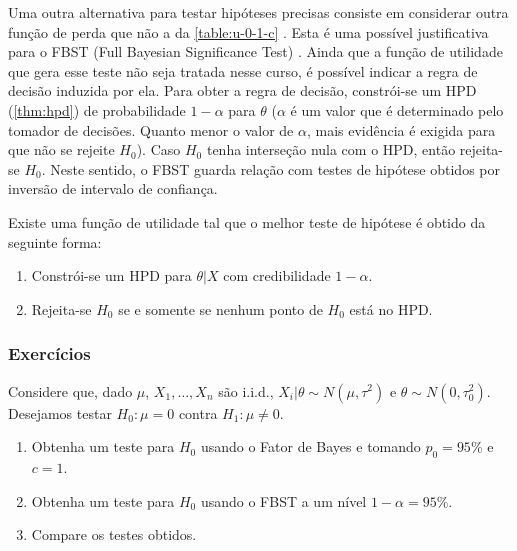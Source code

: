 Uma outra alternativa para testar 
hipóteses precisas consiste em 
considerar outra função de perda que não 
a da \cref{table:u-0-1-c} \citep{Madruga2001}.
Esta é uma possível justificativa para 
o FBST (Full Bayesian Significance Test) 
\citep{Pereira1999}.
Ainda que a função de utilidade que gera esse teste 
não seja tratada nesse curso,
é possível indicar a regra de decisão induzida por ela.
Para obter a regra de decisão, constrói-se 
um HPD (\cref{thm:hpd}) de probabilidade $1-\alpha$ 
para $\theta$ ($\alpha$ é um valor que 
é determinado pelo tomador de decisões. 
Quanto menor o valor de $\alpha$, 
mais evidência é exigida para que 
não se rejeite $H_{0}$).
Caso $H_{0}$ tenha interseção nula com o HPD, 
então rejeita-se $H_{0}$.
Neste sentido, o FBST guarda relação com 
testes de hipótese obtidos por inversão de 
intervalo de confiança.

\begin{theorem}[FBST]
 Existe uma função de utilidade \citep{Madruga2001}
 tal que o melhor teste de hipótese é 
 obtido da seguinte forma:
 \begin{enumerate}
  \item Constrói-se um HPD para $\theta|X$ com
  credibilidade $1-\alpha$.
  \item Rejeita-se $H_{0}$ se e somente se
  nenhum ponto de $H_{0}$ está no HPD.
 \end{enumerate}
\end{theorem}

\subsubsection*{Exercícios}

\begin{exercise}
 Considere que, dado $\mu$, 
 $X_{1},\ldots,X_{n}$ são i.i.d.,
 $X_{i}|\theta \sim N(\mu,\tau^{2})$ e
 $\theta \sim N(0,\tau_{0}^{2})$.
 Desejamos testar $H_{0}:\mu=0$ contra 
 $H_{1}:\mu \neq 0$.
 \begin{enumerate}[label=(\alph*)]
  \item Obtenha um teste para $H_{0}$ usando 
  o Fator de Bayes e tomando $p_{0}=95\%$ e $c=1$.
  \item Obtenha um teste para $H_{0}$ usando o FBST a
  um nível $1-\alpha=95\%$.
  \item Compare os testes obtidos.
 \end{enumerate}
\end{exercise}

